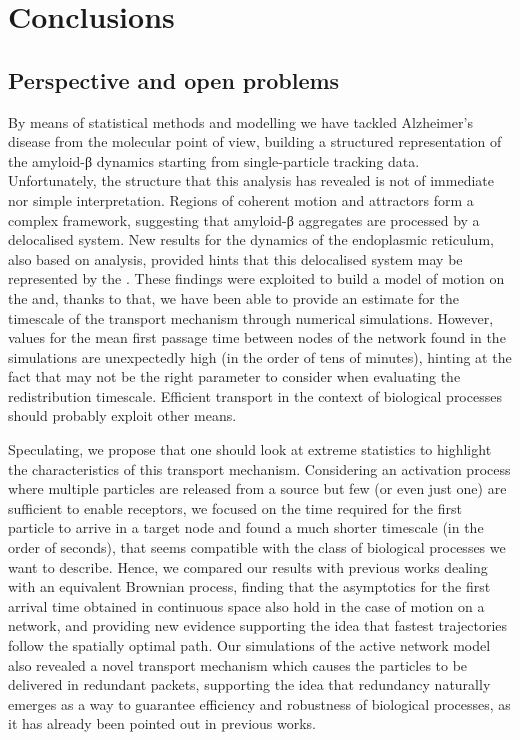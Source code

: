 
\chapter{Conclusions}

\section{Perspective and open problems}

By means of statistical methods and modelling we have tackled Alzheimer's disease from the molecular point of view, building a structured representation of the amyloid-β dynamics starting from single-particle tracking data.
Unfortunately, the structure that this analysis has revealed is not of immediate nor simple interpretation.
Regions of coherent motion and attractors form a complex framework, suggesting that amyloid-β aggregates are processed by a delocalised system.
New results for the dynamics of the endoplasmic reticulum, also based on  analysis, provided hints that this delocalised system may be represented by the .
These findings were exploited to build a model of motion on the  and, thanks to that, we have been able to provide an estimate for the timescale of the  transport mechanism through numerical simulations.
However, values for the mean first passage time between nodes of the network found in the simulations are unexpectedly high (in the order of tens of minutes), hinting at the fact that  may not be the right parameter to consider when evaluating the redistribution timescale. Efficient transport in the context of biological processes should probably exploit other means.

Speculating, we propose that one should look at extreme statistics to highlight the characteristics of this transport mechanism.
Considering an activation process where multiple particles are released from a source but few (or even just one) are sufficient to enable receptors, we focused on the time required for the first particle to arrive in a target node and found a much shorter timescale (in the order of seconds), that seems compatible with the class of biological processes we want to describe.
Hence, we compared our results with previous works dealing with an equivalent Brownian process, finding that the asymptotics for the first arrival time obtained in continuous space also hold in the case of motion on a network, and providing new evidence supporting the idea that fastest trajectories follow the spatially optimal path.
Our simulations of the active network model also revealed a novel transport mechanism which causes the particles to be delivered in redundant packets, supporting the idea that redundancy naturally emerges as a way to guarantee efficiency and robustness of biological processes, as it has already been pointed out in previous works.

